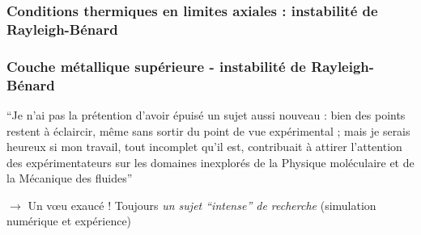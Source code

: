 \subsubsection{Conditions thermiques en limites axiales : instabilité de Rayleigh-Bénard}
\begin{frame}[fragile]
\frametitle{Couche métallique supérieure - instabilité de Rayleigh-Bénard}
\begin{tiny}
\begin{remark}[H. Bénard (1900)]
``Je n’ai pas la prétention d’avoir épuisé un sujet aussi nouveau : bien des points restent à éclaircir, même sans sortir du point de vue expérimental ; mais je serais heureux si mon travail, tout incomplet qu’il est, contribuait à attirer l’attention des expérimentateurs sur les domaines inexplorés de la Physique moléculaire et de la Mécanique des fluides''
\end{remark}
\end{tiny}
\baselineskip 
\scriptsize $\rightarrow$ Un v\oe u exaucé ! Toujours \emph{un sujet ``intense'' de recherche} (simulation numérique et expérience)
\end{frame}
